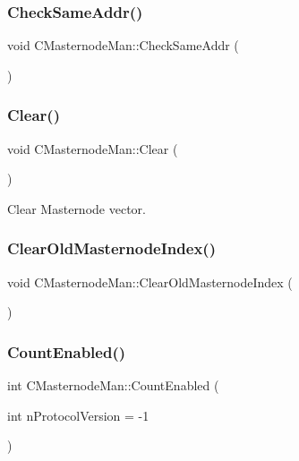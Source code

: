 \subsubsection{\texorpdfstring{Check\+Same\+Addr()}{CheckSameAddr()}}
{\footnotesize\ttfamily void C\+Masternode\+Man\+::\+Check\+Same\+Addr (\begin{DoxyParamCaption}{ }\end{DoxyParamCaption})}

\mbox{\label{class_c_masternode_man_ab18e991ea61209e6282aee80121724dd}} 
\subsubsection{\texorpdfstring{Clear()}{Clear()}}
{\footnotesize\ttfamily void C\+Masternode\+Man\+::\+Clear (\begin{DoxyParamCaption}{ }\end{DoxyParamCaption})}



Clear Masternode vector. 

\mbox{\label{class_c_masternode_man_a3d8022f0810b446e1e06b9474b724a15}} 
\subsubsection{\texorpdfstring{Clear\+Old\+Masternode\+Index()}{ClearOldMasternodeIndex()}}
{\footnotesize\ttfamily void C\+Masternode\+Man\+::\+Clear\+Old\+Masternode\+Index (\begin{DoxyParamCaption}{ }\end{DoxyParamCaption})\hspace{0.3cm}{\ttfamily [inline]}}

\mbox{\label{class_c_masternode_man_a0088c44c990f88340c2fcc66829734a2}} 
\subsubsection{\texorpdfstring{Count\+Enabled()}{CountEnabled()}}
{\footnotesize\ttfamily int C\+Masternode\+Man\+::\+Count\+Enabled (\begin{DoxyParamCaption}\item[{int}]{n\+Protocol\+Version = {\ttfamily -\/1} }\end{DoxyParamCaption})}

